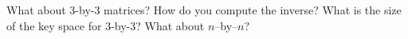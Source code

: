   What about 3-by-3 matrices? How do you compute the inverse?
  What is the size of the key space for 3-by-3?
  What about $n$--by--$n$?
